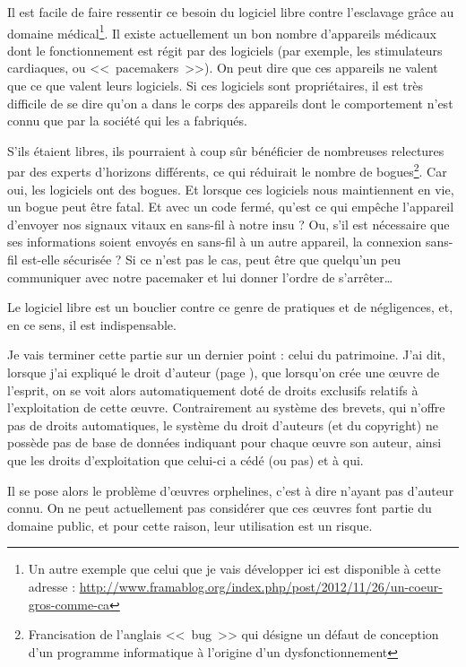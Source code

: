 Il est facile de faire ressentir ce besoin du logiciel libre contre l'esclavage grâce au domaine médical\footnote{Un autre exemple que celui que je vais développer ici est disponible à cette adresse : \url{http://www.framablog.org/index.php/post/2012/11/26/un-coeur-gros-comme-ca}}.
Il existe actuellement un bon nombre d'appareils médicaux dont le fonctionnement est régit par des logiciels (par exemple, les stimulateurs cardiaques, ou <<~pacemakers~>>).
On peut dire que ces appareils ne valent que ce que valent leurs logiciels.
Si ces logiciels sont propriétaires, il est très difficile de se dire qu'on a dans le corps des appareils dont le comportement n'est connu que par la société qui les a fabriqués.

S'ils étaient libres, ils pourraient à coup sûr bénéficier de nombreuses relectures par des experts d'horizons différents, ce qui réduirait le nombre de bogues\footnote{Francisation de l'anglais <<~bug~>> qui désigne un défaut de conception d'un programme informatique à l'origine d'un dysfonctionnement}.
Car oui, les logiciels ont des bogues.
Et lorsque ces logiciels nous maintiennent en vie, un bogue peut être fatal.
Et avec un code fermé, qu'est ce qui empêche l'appareil d'envoyer nos signaux vitaux en sans-fil à notre insu ?
Ou, s'il est nécessaire que ses informations soient envoyés en sans-fil à un autre appareil, la connexion sans-fil est-elle sécurisée ?
Si ce n'est pas le cas, peut être que quelqu'un peu communiquer avec notre pacemaker et lui donner l'ordre de s'arrêter\dots{}

Le logiciel libre est un bouclier contre ce genre de pratiques et de négligences, et, en ce sens, il est indispensable.

Je vais terminer cette partie sur un dernier point : celui du patrimoine.
J'ai dit, lorsque j'ai expliqué le droit d'auteur (page \pageref{droit-auteur}), que lorsqu'on crée une œuvre de l'esprit, on se voit alors automatiquement doté de droits exclusifs relatifs à l'exploitation de cette œuvre.
Contrairement au système des brevets, qui n'offre pas de droits automatiques, le système du droit d'auteurs (et du copyright) ne possède pas de base de données indiquant pour chaque œuvre son auteur, ainsi que les droits d'exploitation que celui-ci a cédé (ou pas) et à qui.

Il se pose alors le problème d'œuvres orphelines, c'est à dire n'ayant pas d'auteur connu.
On ne peut actuellement pas considérer que ces œuvres font partie du domaine public, et pour cette raison, leur utilisation est un risque.

